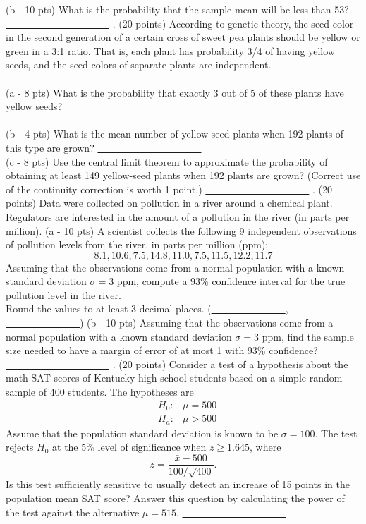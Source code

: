 \documentclass[12pt]{article}
\def\nn{\noindent}
\begin{document}
\vskip 5mm
\nn (b - 10 pts) What is the probability that the sample mean will be less than 53? {\underline{\ \ \ \ \ \ \ \ \ \ \ \ \ \ \ \ \ \ \ \ \ }}
\newpage
\nn 3. (20 points) According to genetic theory, the seed color in the second generation of a certain cross of sweet pea plants should be yellow or green in a 3:1 ratio.
That is, each plant has probability 3/4 of having yellow seeds, and the seed colors of separate plants are independent. \\ \\
\nn (a - 8 pts) What is the probability that exactly 3 out of 5 of these plants have yellow seeds?  {\underline{\ \ \ \ \ \ \ \ \ \ \ \ \ \ \ \ \ \ \ \ \ }} \\  \\
\nn (b - 4 pts) What is the mean number of yellow-seed plants when 192 plants of this type are grown?  {\underline{\ \ \ \ \ \ \ \ \ \ \ \ \ \ \ \ \ \ \ \ \ }} \\
\nn (c - 8 pts) Use the central limit theorem to approximate the probability of obtaining at least
149 yellow-seed plants when 192 plants are grown? (Correct use of the continuity correction is worth 1 point.)  {\underline{\ \ \ \ \ \ \ \ \ \ \ \ \ \ \ \ \ \ \ \ \ }}
\newpage
\nn 4. (20 points) Data were collected on pollution in a river around a chemical plant.  Regulators are interested in the amount of a pollution in the river (in parts per million).
\vskip 5mm
\nn (a - 10 pts) A scientist collects the following 9 independent observations of pollution levels from the river, in parts per million (ppm):
\[
8.1, 10.6, 7.5, 14.8, 11.0, 7.5, 11.5, 12.2, 11.7
\]
Assuming that the observations come from a normal population with a known standard deviation $\sigma=3$ ppm, compute a 93\% confidence interval for the true pollution level in the river. \\
Round the values to at least 3 decimal places. {(\underline{\ \ \ \ \ \ \ \ \ \ \ \ \ \ \ }, \underline{\ \ \ \ \ \ \ \ \ \ \ \ \ \ \ })} 
\vskip 5mm
\nn (b - 10 pts) Assuming that the observations come from a normal population with a known standard deviation $\sigma=3$ ppm, find the sample size needed to have a margin of error of at most 1 with 93\% confidence? {\underline{\ \ \ \ \ \ \ \ \ \ \ \ \ \ \ \ \ \ \ \ \ }}
\newpage
\nn 5. (20 points) Consider a test of a hypothesis about the math SAT scores of Kentucky high school students based on a simple random sample of 400 students. The hypotheses are
\begin{eqnarray}
\nonumber &H_0:& \mu=500 \\
\nonumber &H_a:& \mu>500
\end{eqnarray}
Assume that the population standard deviation is known to be $\sigma=100$. The test rejects $H_0$ at the 5\% level of significance when $z\geq 1.645$, where
\[
z=\frac{\bar{x}-500}{100/\sqrt{400}}.
\]
Is this test sufficiently sensitive to usually detect an increase of 15 points in the population mean SAT score? Answer this question by calculating the power of the test against the alternative $\mu=515$. {\underline{\ \ \ \ \ \ \ \ \ \ \ \ \ \ \ \ \ \ \ \ \ }}
\end{document}

